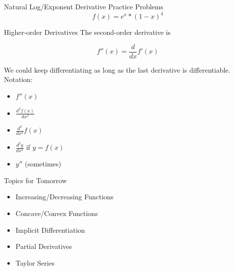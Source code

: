 \documentclass[aspectratio=169]{beamer}
\begin{document}
\begin{frame}{Natural Log/Exponent Derivative Practice Problems}\label{main1}
	\vspace{-4cm}
    \[
    f(x) = e^{x}*(1-x)^{4}
    \]
\end{frame}

\begin{frame}{Higher-order Derivatives}\label{main1}
The second-order derivative is

\[
f''(x) = \frac{d}{dx} f'(x)
\]

We could keep differentiating as long as the last derivative is differentiable. Notation:
\begin{itemize}
\begin{itemize}
    \item $f''(x)$
    \item $\frac{d^2 f(x)}{dx^2}$
    \item $\frac{d^2}{dx^2} f(x)$
    \item $\frac{d^2 y}{dx^2}$ if $y = f(x)$
    \item $y''$ (sometimes)
\end{itemize}
\end{itemize}
\end{frame}

\begin{frame}{Topics for Tomorrow}\label{main1}

\begin{itemize}
	\begin{itemize}
		\item Increasing/Decreasing Functions
		\item Concave/Convex Functions
		\item Implicit Differentiation
		\item Partial Derivatives
		\item Taylor Series
	\end{itemize}
\end{itemize}
\end{frame}
\end{document}
